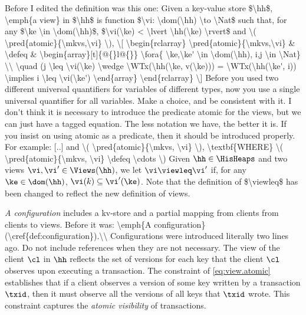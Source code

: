 \ac{Before I edited the definition was this one: 
Given a key-value store $\hh$, \emph{a view} in $\hh$ is function  
$\vi: \dom(\hh) \to \Nat$ such that, for any $\ke \in \dom(\hh)$, 
$\vi(\ke) < \lvert \hh(\ke) \rvert$ 
and \( \pred{atomic}{\mkvs,\vi} \),
\[
\begin{rclarray}
\pred{atomic}{\mkvs,\vi} & \defeq &
\begin{array}[t]{@{}l@{}}
\fora{ \ke,\ke' \in \dom(\hh), i,j \in \Nat} \\
\quad (j \leq \vi(\ke) \wedge 
\WTx(\hh(\ke, v(\ke))) = \WTx(\hh(\ke', i)) \implies i \leq \vi(\ke')
\end{array}
\end{rclarray}
\]
Before you used two different universal quantifiers for variables of different types, 
now you use a single universal quantifier for all variables. Make a choice, and be consistent 
with it. I don't think it is necessary to introduce the predicate atomic for the views, 
but we can just have a tagged equation. The less notation we have, the better it is. 
If you insist on using atomic as a predicate, then it should be introduced properly. 
For example: [..] and \( \pred{atomic}{\mkvs, \vi} \), \textbf{WHERE} \( \pred{atomic}{\mkvs, \vi} \defeq \cdots \)
}
Given $\hh \in \HisHeaps$ and two views $\vi, \vi' \in \Views(\hh)$, 
we let $\vi \viewleq \vi'$ if, for any $\ke \in \dom(\hh)$, $\vi(k) \subseteq \vi'(\ke)$. 
\ac{Note that the definition of $\viewleq$ has been changed to reflect the new definition of views.}

\emph{A configuration}
includes a kv-store and a partial mapping from clients from clients to views.
\ac{Before it was: \emph{A configuration} (\cref{def:configuration}).\\
Configurations were introduced literally two lines ago. Do not include references when 
they are not necessary.}
The view of the client $\cl$ in $\hh$ reflects the set of versions for each key 
that the client \(\cl \) observes upon executing a transaction. 
The constraint of \cref{eq:view.atomic} establishes that if a client observes 
a version of some key written by a transaction $\txid$, then it must observe all the versions of 
all keys that $\txid$ wrote. This constraint captures the \emph{atomic visibility} of transactions.

